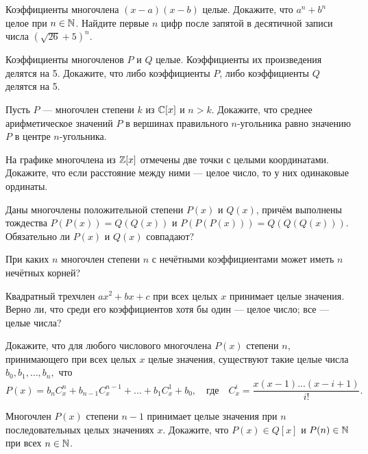 \documentclass[a4paper,12pt]{article}
\begin{document}
 Коэффициенты многочлена $(x-a)(x-b)$ целые.
Докажите, что $a^n+b^n$ целое при $n\in\mathbb{N}$.
 Найдите первые $n$ цифр после запятой в десятичной записи
числа $(\sqrt{26}+5)^n$.



Коэффициенты многочленов $P$ и $Q$ целые. Коэффициенты
их произведения делятся на 5. Докажите, что либо коэффициенты $P$,
либо коэффициенты $Q$ делятся на 5.

 Пусть $P$ --- многочлен степени $k$ из $\mathbb{C}[x]$ и $n>k$.
Докажите, что среднее арифметическое значений $P$ в вершинах
правильного $n$-угольника равно значению $P$ в центре $n$-угольника.

На графике многочлена из $\mathbb{Z}[x]$ отмечены две точки с целыми координатами. Докажите, что если
расстояние между ними --- целое число, то у них одинаковые ординаты. %

Даны многочлены положительной степени $P(x)$ и $Q(x)$, причём выполнены тождества $P(P(x))=Q(Q(x))$ и
$P(P(P(x)))=Q(Q(Q(x)))$. Обязательно ли $P(x)$ и $Q(x)$ совпадают?

При каких $n$ многочлен степени $n$ с нечётными коэффициентами
может иметь $n$ нечётных корней?

Квадратный трехчлен $ax^2 + bx + c$ при всех целых $x$ принимает целые значения. Верно ли, что среди его коэффициентов
 хотя бы один --- целое число;
 все --- целые числа?

 Докажите, что для любого числового многочлена $P(x)$ степени $n$, принимающего при всех целых $x$ целые значения,
существуют такие целые числа $b_0, b_1, \ldots, b_n,$  что
$$
P(x) = b_n C_x^n + b_{n-1} C_x^{n-1} + ... + b_1 C_x^1 + b_0,\quad
\text{где} \quad C_x^i = \frac{x(x-1) ... (x-i+1)}{i!}.
$$


\vspace*{-5mm}
Многочлен $P(x)$ степени $n-1$ принимает целые значения при $n$ последовательных целых значениях $x$. Докажите, что $P(x)\in Q[x]$ и
$P(n)\in\mathbb{N}$ при всех $n\in\mathbb{N}$.




\end{document}
